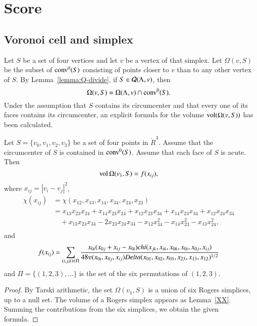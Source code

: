\section{Score}





\subsection{Voronoi cell and simplex}


Let $S$ be a set of four vertices and let $v$ be a vertex of that simplex. Let
$\Omega(v,S)$ be the subset of ${\operatorname{conv}}^0(S)$ consisting of points closer
to $v$ than to any other vertex of $S$. By
Lemma~\ref{lemma:Q-divide}, if $S\in{\mathcal Q}(\Lambda,v)$, then
$$\Omega(v,S) = \Omega(\Lambda,v)\cap{\operatorname{conv}}^0(S).$$
Under the assumption that $S$ contains its circumcenter and that
every one of its faces contains its circumcenter, an explicit
formula for the volume ${\operatorname{vol}}(\Omega(v,S))$ has been
calculated.  %

\begin{lemma}\label{lemma:omega-simp}  Let $S = \{v_0,v_1,v_2,v_3\}$ be a set of four points in $\ring{R}^3$.
Assume that the circumcenter of $S$ is contained in ${\operatorname{conv}}^0(S)$.  Assume
that each face of $S$ is acute.
Then 
  $$
  {\operatorname{vol}}\,\Omega(v_1,S) = f(x_{ij}),
  $$ 
where $x_{ij} = |v_i-v_j|^2$, 
$$
\begin{array}{lll}
\chi(x_{ij}) &= \chi(x_{12},x_{13},x_{14},x_{34},x_{24},x_{23})\\
     &=
      x_{13} x_{23} x_{24} + x_{14} x_{23} x_{24}  + 
      x_{12} x_{23} x_{34} + x_{14} x_{23} x_{34} + x_{12} x_{24} x_{34}\\ 
      &\quad + x_{13} x_{24} x_{34} - 
      2 x_{23} x_{24} x_{34} - x_{12} x_{34}^2 
      - x_{14} x_{23}^2 - x_{13} x_{24}^2,\\
\end{array}
$$
and
$$
   f(x_{ij}) = \sum_{(i,j,k)\in \Pi} \frac{x_{0i} (x_{0j}+x_{ij}-x_{0i})\chi(x_{jk},x_{ik},x_{0k},x_{0i},x_{0j},x_{ij})}
   {48\ups(x_{0i},x_{0j},x_{ij})\Delta(x_{01},x_{02},x_{03},x_{23},x_{13},x_{12})^{1/2}}
$$
and $\Pi = \{(1,2,3),\ldots\}$ is the set of the six permutations of $(1,2,3)$.
\end{lemma}

\begin{proof} By Tarski arithmetic, the set $\Omega(v_1,S)$ is a union of
six Rogers simplices, up to a null set.  The volume of a Rogers simplex appears
as Lemma~\ref{XX}.  Summing the contributions from the six simplices, we obtain
the given formula.
\end{proof}

